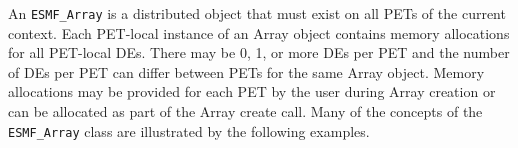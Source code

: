 
An {\tt ESMF\_Array} is a distributed object that must exist on all PETs of the current context. Each PET-local instance of an Array object contains memory allocations for all PET-local DEs. There may be 0, 1, or more DEs per PET and the number of DEs per PET can differ between PETs for the same Array object. Memory allocations may be provided for each PET by the user during Array creation or can be allocated as part of the Array create call. Many of the concepts of the {\tt ESMF\_Array} class are illustrated by the following examples.
